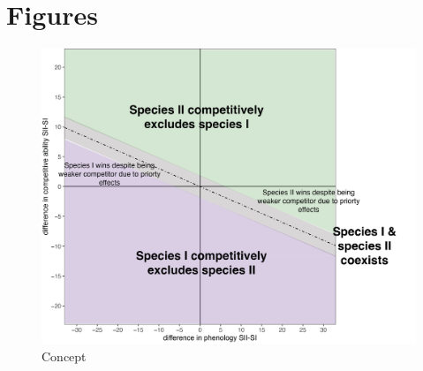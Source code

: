 \documentclass{article}[12pt]
\begin{document}






\pagebreak
\section*{Figures}
\begin{figure}[h!]
  \centering
 \includegraphics[width=\textwidth]{..//plots/introprief.png}
    \caption{Concept}
    \label{Fig:con1}
\end{figure}
\end{document}
